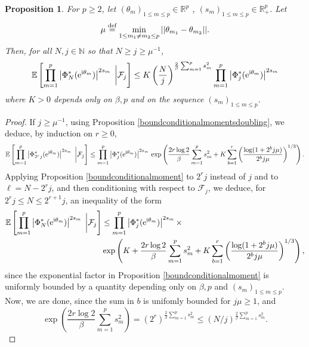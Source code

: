 \documentclass[]{article}
\newtheorem{prop}[thm]{Proposition}
\begin{document}
\begin{prop} \label{boundconditionalmomentsfinal}
For $p \geq 2$, let $(\theta_m)_{1 \leq m \leq p}\in \mathbb{R}^p$ 
, $(s_m)_{1 \leq m \leq p}\in \mathbb{R}_+^p$. 
Let 
$$\mu \overset{\textnormal{def}}{=} \min_{1 \leq m_1 \neq m_2 \leq p} 
||\theta_{m_1} - \theta_{m_2}||.$$
Then, for all $N,j\in \mathbb{N}$ so that $N \geq j \geq \mu^{-1}$, 
$$\mathbb{E} \left[ \prod_{m=1}^p \left|\Phi^*_{N} (\mathrm{e}^{\textnormal{i} \theta_m})\right|^{2s_m} \;  \bigg| \mathcal{F}_j \right]
\leq K \left( \frac{N}{j} \right)^{\frac{2}{\beta} \sum_{m=1}^p s_m^2}  \prod_{m=1}^p \left|\Phi^*_{j} (\mathrm{e}^{\textnormal{i} \theta_m})
\right|^{2s_m} 
$$
where $K > 0$ depends only on $\beta, p$
and on the sequence $(s_m)_{1 \leq m \leq p}$. 
\end{prop}
\begin{proof}
If $j \geq \mu^{-1}$, using Proposition \ref{boundconditionalmomentsdoubling}, we deduce, by 
induction on $r \geq 0$,  
$$\mathbb{E} \left[ \prod_{m=1}^p \left|\Phi^*_{2^r j} (\mathrm{e}^{\textnormal{i} \theta_m})\right|^{2s_m} \;  \bigg| \mathcal{F}_j \right]
\leq 
\prod_{m=1}^p \left|\Phi^*_{j} (\mathrm{e}^{\textnormal{i} \theta_m})
\right|^{2s_m} \, \exp \left(
\frac{2 r \log 2}{\beta}  
 \sum_{m=1}^{p} s_m^2 
+ K \sum_{b = 1}^r \left( \frac{\log (1 + 2^b j \mu)}{2^b j \mu} \right)^{1/3} \right). 
$$
Applying Proposition \ref{boundconditionalmoment}
to $2^r j$ instead of $j$ and to $\ell = N - 2^r j$,
and then conditioning with respect to $\mathcal{F}_j$, we deduce, for $2^r j \leq N \leq 2^{r+1} j$, an inequality of the form 
\begin{align*}
\mathbb{E} \left[ \prod_{m=1}^p \left|\Phi^*_{N} (\mathrm{e}^{\textnormal{i} \theta_m})\right|^{2s_m} \;  \bigg| \mathcal{F}_j \right]
&\leq 
  \prod_{m=1}^p \left|\Phi^*_{j} (\mathrm{e}^{\textnormal{i} \theta_m})
\right|^{2s_m} \times \\ &\exp \left(K + 
\frac{2 r \log 2}{\beta}  
 \sum_{m=1}^{p} s_m^2 
+ K \sum_{b = 1}^r \left( \frac{\log (1 + 2^b j \mu)}{2^b j \mu} \right)^{1/3} \right),
\end{align*}
since the exponential factor in Proposition \ref{boundconditionalmoment} is uniformly bounded 
by a quantity depending only on $\beta, p$ and 
$(s_m)_{1 \leq m \leq p}$. 
Now, we are done, since the sum in $b$ is unifomly bounded for $j \mu \geq 1$, and 
$$\exp \left(\frac{2 r \log 2}{\beta}  
 \sum_{m=1}^{p} s_m^2 \right) = (2^{r})^{\frac{2}{\beta} \sum_{m=1}^p s_m^2} 
 \leq (N/j)^{\frac{2}{\beta} \sum_{m=1}^p s_m^2}. $$

\end{proof}
\end{document}

